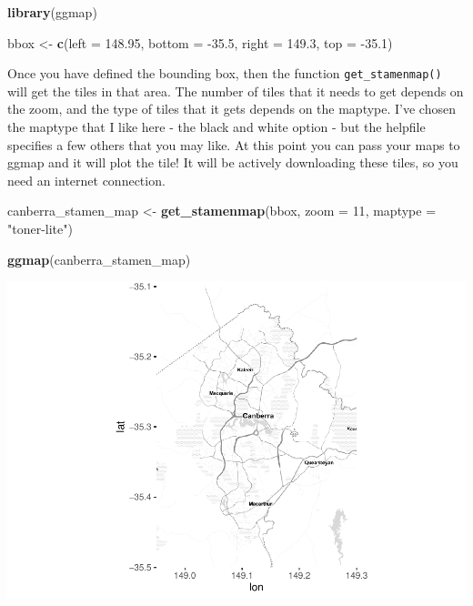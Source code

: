 \documentclass[
]{book}
\newenvironment{Shaded}{\begin{snugshade}}{\end{snugshade}}
\newcommand{\DataTypeTok}[1]{\textcolor[rgb]{0.13,0.29,0.53}{#1}}
\newcommand{\DecValTok}[1]{\textcolor[rgb]{0.00,0.00,0.81}{#1}}
\newcommand{\FloatTok}[1]{\textcolor[rgb]{0.00,0.00,0.81}{#1}}
\newcommand{\KeywordTok}[1]{\textcolor[rgb]{0.13,0.29,0.53}{\textbf{#1}}}
\newcommand{\NormalTok}[1]{#1}
\newcommand{\StringTok}[1]{\textcolor[rgb]{0.31,0.60,0.02}{#1}}
\begin{document}
\begin{Shaded}
\begin{Highlighting}[]
\KeywordTok{library}\NormalTok{(ggmap)}

\NormalTok{bbox <-}\StringTok{ }\KeywordTok{c}\NormalTok{(}\DataTypeTok{left =} \FloatTok{148.95}\NormalTok{, }\DataTypeTok{bottom =} \FloatTok{-35.5}\NormalTok{, }\DataTypeTok{right =} \FloatTok{149.3}\NormalTok{, }\DataTypeTok{top =} \FloatTok{-35.1}\NormalTok{)}
\end{Highlighting}
\end{Shaded}

Once you have defined the bounding box, then the function \texttt{get\_stamenmap()} will get the tiles in that area. The number of tiles that it needs to get depends on the zoom, and the type of tiles that it gets depends on the maptype. I've chosen the maptype that I like here - the black and white option - but the helpfile specifies a few others that you may like. At this point you can pass your maps to ggmap and it will plot the tile! It will be actively downloading these tiles, so you need an internet connection.

\begin{Shaded}
\begin{Highlighting}[]
\NormalTok{canberra_stamen_map <-}\StringTok{ }\KeywordTok{get_stamenmap}\NormalTok{(bbox, }\DataTypeTok{zoom =} \DecValTok{11}\NormalTok{, }\DataTypeTok{maptype =} \StringTok{"toner-lite"}\NormalTok{)}

\KeywordTok{ggmap}\NormalTok{(canberra_stamen_map)}
\end{Highlighting}
\end{Shaded}

\includegraphics{telling_stories_with_data_files/figure-latex/unnamed-chunk-105-1.pdf}
\end{document}
